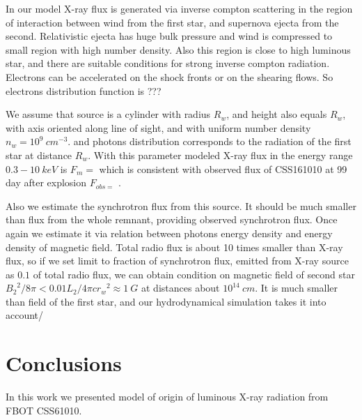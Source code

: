 \documentclass{article}
\begin{document}
	In our model X-ray flux is generated via inverse compton scattering in the region of interaction between wind from the first star, and supernova ejecta from the second. Relativistic ejecta has huge bulk pressure and wind is compressed to small region with high number density. Also this region is close to high luminous star, and there are suitable conditions for strong inverse compton radiation. Electrons can be accelerated on the shock fronts or on the shearing flows. So electrons distribution function is ???
	
	We assume that source is a cylinder with radius $R_w$, and height also equals $R_w$, with axis oriented along line of sight, and with uniform number density $n_w = 10^9~cm^{-3}$. 
	and photons distribution corresponds to the radiation of the first star at distance $R_w$. With this parameter modeled X-ray flux in the energy range $0.3-10~keV$ is $F_m = $ which is consistent with observed flux of CSS161010 at 99 day after explosion $F_{obs = }$ \cite{Coppejans2020}.
	
	Also we estimate the synchrotron flux from this source. It should be much smaller than flux from the whole remnant, providing observed synchrotron flux. Once again we estimate it via relation between photons energy density and energy density of magnetic field. Total radio flux is about 10 times smaller than X-ray flux, so if we set limit to fraction of synchrotron flux, emitted from X-ray source as $0.1$ of total radio flux, we can obtain condition on magnetic field of second star ${B_2}^2/8\pi < 0.01 L_2/4\pi c {r_w}^2 \approx 1~G$ at distances about $10^{14}~cm$. It is much smaller than field of the first star, and our hydrodynamical simulation takes it into account/
	
	\section{Conclusions}
	In this work we presented model of origin of luminous X-ray radiation from FBOT CSS61010. 
	
	
	
	
\end{document}
